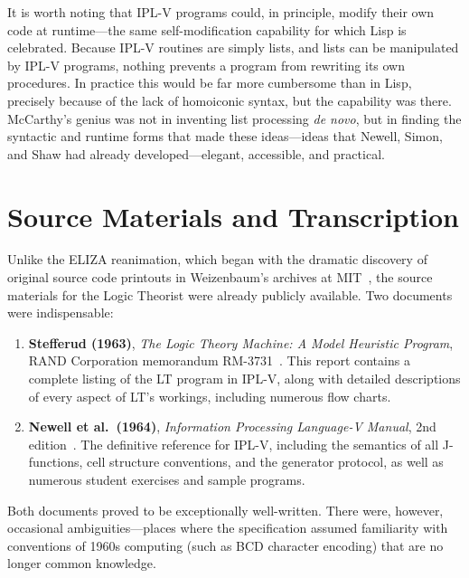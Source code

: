 \documentclass[journal]{IEEEtran}
\begin{document}

It is worth noting that IPL-V programs could, in principle, modify
their own code at runtime---the same self-modification capability for
which Lisp is celebrated. Because IPL-V routines are simply lists, and
lists can be manipulated by IPL-V programs, nothing prevents a program
from rewriting its own procedures. In practice this would be far more
cumbersome than in Lisp, precisely because of the lack of homoiconic
syntax, but the capability was there. McCarthy's genius was not in
inventing list processing \textit{de novo}, but in finding the
syntactic and runtime forms that made these ideas---ideas that Newell,
Simon, and Shaw had already developed---elegant, accessible, and
practical. 

\section{Source Materials and Transcription}
\label{sec:sources}

Unlike the ELIZA reanimation, which began with the dramatic discovery
of original source code printouts in Weizenbaum's archives at
MIT~\cite{lane2025eliza}, the source materials for the Logic Theorist
were already publicly available. Two documents were indispensable:

\begin{enumerate}
\item \textbf{Stefferud (1963)}, \textit{The Logic Theory Machine: A
  Model Heuristic Program}, RAND Corporation memorandum
  RM-3731~\cite{stefferud1963lt}. This report contains a complete
  listing of the LT program in IPL-V, along with detailed descriptions
  of every aspect of LT's workings, including numerous flow charts.

\item \textbf{Newell et al.\ (1964)}, \textit{Information Processing
  Language-V Manual}, 2nd edition~\cite{newell1964ipl}. The definitive
  reference for IPL-V, including the semantics of all J-functions,
  cell structure conventions, and the generator protocol, as well as
  numerous student exercises and sample programs.
\end{enumerate}

Both documents proved to be exceptionally well-written. There were,
however, occasional ambiguities---places where the specification
assumed familiarity with conventions of 1960s computing (such as BCD
character encoding) that are no longer common knowledge.
\end{document}
